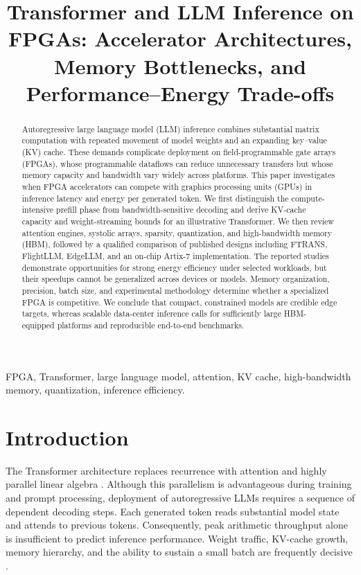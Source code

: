 \documentclass[conference,10pt]{IEEEtran}
\title{Transformer and LLM Inference on FPGAs: Accelerator Architectures, Memory Bottlenecks, and Performance--Energy Trade-offs}
\author{\IEEEauthorblockN{Mostafizur Rahman, Turja, Deepak}
\IEEEauthorblockA{Department of Electronic Engineering\\
Hochschule Hamm-Lippstadt, Germany}}
\begin{document}
\maketitle
\begin{abstract}
Autoregressive large language model (LLM) inference combines substantial matrix computation with repeated movement of model weights and an expanding key--value (KV) cache. These demands complicate deployment on field-programmable gate arrays (FPGAs), whose programmable dataflows can reduce unnecessary transfers but whose memory capacity and bandwidth vary widely across platforms. This paper investigates when FPGA accelerators can compete with graphics processing units (GPUs) in inference latency and energy per generated token. We first distinguish the compute-intensive prefill phase from bandwidth-sensitive decoding and derive KV-cache capacity and weight-streaming bounds for an illustrative Transformer. We then review attention engines, systolic arrays, sparsity, quantization, and high-bandwidth memory (HBM), followed by a qualified comparison of published designs including FTRANS, FlightLLM, EdgeLLM, and an on-chip Artix-7 implementation. The reported studies demonstrate opportunities for strong energy efficiency under selected workloads, but their speedups cannot be generalized across devices or models. Memory organization, precision, batch size, and experimental methodology determine whether a specialized FPGA is competitive. We conclude that compact, constrained models are credible edge targets, whereas scalable data-center inference calls for sufficiently large HBM-equipped platforms and reproducible end-to-end benchmarks.
\end{abstract}
\begin{IEEEkeywords}
FPGA, Transformer, large language model, attention, KV cache, high-bandwidth memory, quantization, inference efficiency.
\end{IEEEkeywords}

\section{Introduction}
The Transformer architecture replaces recurrence with attention and highly parallel linear algebra \cite{vaswani2017}. Although this parallelism is advantageous during training and prompt processing, deployment of autoregressive LLMs requires a sequence of dependent decoding steps. Each generated token reads substantial model state and attends to previous tokens. Consequently, peak arithmetic throughput alone is insufficient to predict inference performance. Weight traffic, KV-cache growth, memory hierarchy, and the ability to sustain a small batch are frequently decisive \cite{shazeer2019,kwon2023}.
\end{document}
